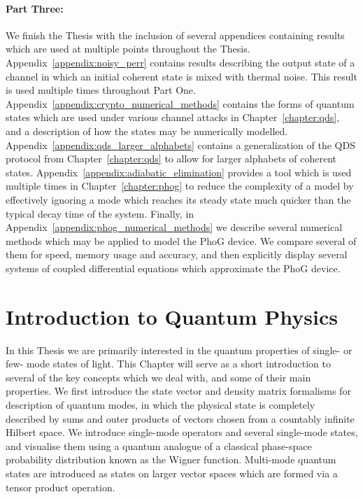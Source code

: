 \paragraph{Part Three:} We finish the Thesis with the inclusion of several appendices containing results which are used at multiple points throughout the Thesis.  Appendix~\ref{appendix:noisy_perr} contains results describing the output state of a channel in which an initial coherent state is mixed with thermal noise. This result is used multiple times throughout Part One. Appendix~\ref{appendix:crypto_numerical_methods} contains the forms of quantum states which are used under various channel attacks in Chapter~\ref{chapter:qds}, and a description of how the states may be numerically modelled. Appendix~\ref{appendix:qds_larger_alphabets} contains a generalization of the QDS protocol from Chapter~\ref{chapter:qds} to allow for larger alphabets of coherent states.  Appendix~\ref{appendix:adiabatic_elimination} provides a tool which is used multiple times in Chapter~\ref{chapter:phog} to reduce the complexity of a model by effectively ignoring a mode which reaches its steady state much quicker than the typical decay time of the system. Finally, in Appendix~\ref{appendix:phog_numerical_methods} we describe several numerical methods which may be applied to model the PhoG device. We compare several of them for speed, memory usage and accuracy, and then explicitly display several systems of coupled differential equations which approximate the PhoG device. 

\section{Introduction to Quantum Physics}

In this Thesis we are primarily interested in the quantum properties of single- or few- mode states of light. This Chapter will serve as a short introduction to several of the key concepts which we deal with, and some of their main properties. We first introduce the state vector and density matrix formalisms for description of quantum modes, in which the physical state is completely described by sums and outer products of vectors chosen from a countably infinite Hilbert space. We introduce single-mode operators and several single-mode states, and visualise them using a quantum analogue of a classical phase-space probability distribution known as the Wigner function. Multi-mode quantum states are introduced as states on larger vector spaces which are formed via a tensor product operation.

